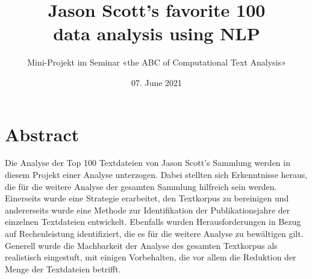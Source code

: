 \title{\vspace{-2cm}Jason Scott's favorite 100\\data analysis using NLP}
\subtitle{Mini-Projekt im Seminar «the ABC of Computational Text Analysis»}
\date{\small{07. June 2021}}
\maketitle

\section*{Abstract}

Die Analyse der Top 100 Textdateien von Jason Scott's Sammlung werden in diesem Projekt einer Analyse unterzogen. Dabei stellten sich Erkenntnisse heraus, die für die weitere Analyse der gesamten Sammlung hilfreich sein werden. Einerseits wurde eine Strategie erarbeitet, den Textkorpus zu bereinigen und andererseits wurde eine Methode zur Identifikation der Publikationsjahre der einzelnen Textdateien entwickelt. Ebenfalls wurden Herausforderungen in Bezug auf Rechenleistung identifiziert, die es für die weitere Analyse zu bewältigen gilt. Generell wurde die Machbarkeit der Analyse des gesamten Textkorpus als realistisch eingestuft, mit einigen Vorbehalten, die vor allem die Reduktion der Menge der Textdateien betrifft.

\newpage

\setcounter{tocdepth}{3}
\tableofcontents

\newpage
{}
